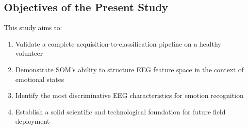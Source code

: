 \subsection{Objectives of the Present Study}

This study aims to:
\begin{enumerate}
    \item Validate a complete acquisition-to-classification pipeline on a healthy volunteer
    \item Demonstrate SOM's ability to structure EEG feature space in the context of emotional states
    \item Identify the most discriminative EEG characteristics for emotion recognition
    \item Establish a solid scientific and technological foundation for future field deployment
\end{enumerate}